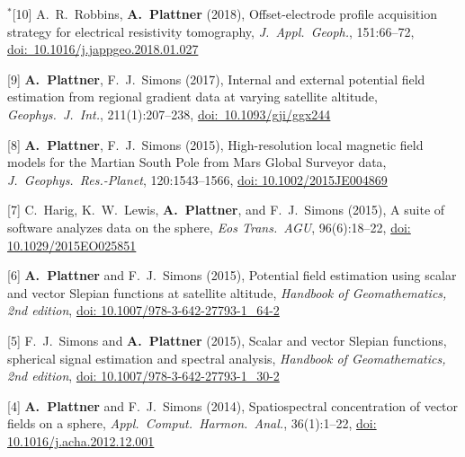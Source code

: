 \documentclass[10pt]{article}
\begin{document}
\spcp
\hspace{-0.835cm}$^*$[10] A.~R.~Robbins, \textbf{A.~Plattner} (2018),
Offset-electrode profile acquisition strategy for
electrical resistivity tomography,
\emph{J.~Appl.~Geoph.}, 151:66--72, \href{https://www.sciencedirect.com/science/article/pii/S0926985117308376?via%3Dihub}{doi:~10.1016/j.jappgeo.2018.01.027} 


\spcp
\hspace{-0.5cm}[9] \textbf{A.~Plattner}, F.~J.~Simons (2017),
Internal and external potential field estimation
from regional gradient data at varying satellite altitude,
\emph{Geophys.~J.~Int.}, 211(1):207--238, \href{https://academic.oup.com/gji/article-lookup/doi/10.1093/gji/ggx244}{doi:~10.1093/gji/ggx244} 

\spcp
\hspace{-0.5cm}[8] \textbf{A.~Plattner}, F.~J.~Simons (2015),
High-resolution local magnetic field models for the
Martian South Pole
from Mars Global Surveyor data,
\emph{J.~Geophys.~Res.-Planet}, 120:1543--1566,
\href{http://onlinelibrary.wiley.com/doi/10.1002/2015JE004869/abstract}{doi: 10.1002/2015JE004869}

\spcp
\hspace{-0.5cm}[7] C.~Harig, K.~W.~Lewis, \textbf{A.~Plattner}, and F.~J.~Simons (2015),
A suite of software analyzes data on the sphere,
\emph{Eos Trans.~AGU}, 96(6):18--22,
\href{https://eos.org/project-updates/a-suite-of-software-analyzes-data-on-the-sphere-2}{doi: 10.1029/2015EO025851}

\spcp
\hspace{-0.5cm}[6] \textbf{A.~Plattner} and F.~J.~Simons (2015),
Potential field estimation using scalar and vector Slepian functions at satellite altitude,
\emph{Handbook of Geomathematics, 2nd edition},
\href{https://link.springer.com/referenceworkentry/10.1007\%2F978-3-642-27793-1_64-2}{doi: 10.1007/978-3-642-27793-1\_64-2}

\spcp
\hspace{-0.5cm}[5] F.~J.~Simons and \textbf{A.~Plattner} (2015),
Scalar and vector Slepian functions, spherical signal estimation and spectral analysis,
\emph{Handbook of Geomathematics, 2nd edition},
\href{https://link.springer.com/referenceworkentry/10.1007\%2F978-3-642-27793-1_30-2}{doi: 10.1007/978-3-642-27793-1\_30-2}

\spcp
\hspace{-0.5cm}[4] \textbf{A.~Plattner} and F.~J.~Simons (2014),
Spatiospectral concentration of vector fields on a sphere,
\emph{Appl.~Comput.~Harmon.~Anal.}, 36(1):1--22, 
\href{http://www.sciencedirect.com/science/article/pii/S106352031300002X?via\%3Dihub}{doi: 10.1016/j.acha.2012.12.001}
\end{document}
